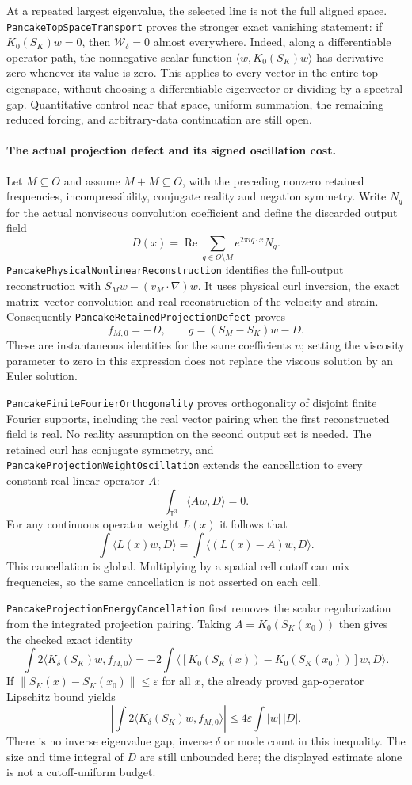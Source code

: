 \documentclass[11pt]{article}
\theoremstyle{definition}
\begin{document}
At a repeated largest eigenvalue, the selected line is not the full
aligned space. \texttt{PancakeTopSpaceTransport} proves the stronger exact
vanishing statement: if $K_0(S_K)w=0$, then $\mathcal W_\delta=0$ almost
everywhere. Indeed, along a differentiable operator path, the nonnegative
scalar function $\langle w,K_0(S_K)w\rangle$ has derivative zero whenever
its value is zero. This applies to every vector in the entire top
eigenspace, without choosing a differentiable eigenvector or dividing by
a spectral gap. Quantitative control near that space, uniform summation,
the remaining reduced forcing, and arbitrary-data continuation are still open.

\paragraph{The actual projection defect and its signed oscillation cost.}
Let $M\subseteq O$ and assume $M+M\subseteq O$, with the preceding
nonzero retained frequencies, incompressibility, conjugate reality and
negation symmetry. Write $N_q$ for the actual nonviscous convolution
coefficient and define the discarded output field
\[
 D(x)=\operatorname{Re}\sum_{q\in O\setminus M}e^{2\pi i q\cdot x}N_q.
\]
\texttt{PancakePhysicalNonlinearReconstruction} identifies the full-output
reconstruction with $S_Mw-(v_M\cdot\nabla)w$. It uses physical curl
inversion, the exact matrix--vector convolution and real reconstruction
of the velocity and strain. Consequently
\texttt{PancakeRetainedProjectionDefect} proves
\[
 f_{M,0}=-D,\qquad g=(S_M-S_K)w-D.
\]
These are instantaneous identities for the same coefficients $u$;
setting the viscosity parameter to zero in this expression does not
replace the viscous solution by an Euler solution.

\texttt{PancakeFiniteFourierOrthogonality} proves orthogonality of
disjoint finite Fourier supports, including the real vector pairing when
the first reconstructed field is real. No reality assumption on the
second output set is needed. The retained curl has conjugate symmetry,
and \texttt{PancakeProjectionWeightOscillation} extends the cancellation
to every constant real linear operator $A$:
\[
 \int_{\mathbb T^3}\langle Aw,D\rangle=0.
\]
For any continuous operator weight $L(x)$ it follows that
\[
 \int\langle L(x)w,D\rangle
   =\int\langle(L(x)-A)w,D\rangle.
\]
This cancellation is global. Multiplying by a spatial cell cutoff can
mix frequencies, so the same cancellation is not asserted on each cell.

\texttt{PancakeProjectionEnergyCancellation} first removes the scalar
regularization from the integrated projection pairing. Taking
$A=K_0(S_K(x_0))$ then gives the checked exact identity
\[
 \int 2\langle K_\delta(S_K)w,f_{M,0}\rangle
  =-2\int\bigl\langle
       [K_0(S_K(x))-K_0(S_K(x_0))]w,D\bigr\rangle.
\]
If $\|S_K(x)-S_K(x_0)\|\le\varepsilon$ for all $x$, the already
proved gap-operator Lipschitz bound yields
\[
 \left|\int 2\langle K_\delta(S_K)w,f_{M,0}\rangle\right|
       \le4\varepsilon\int |w|\,|D|.
\]
There is no inverse eigenvalue gap, inverse $\delta$ or mode count in
this inequality. The size and time integral of $D$ are still unbounded
here; the displayed estimate alone is not a cutoff-uniform budget.
\end{document}
